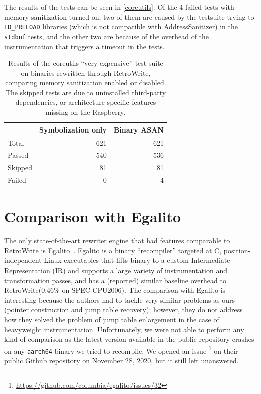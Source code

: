 \documentclass[a4paper,11pt,oneside]{report}
\newcommand{\sysname}{RetroWrite\xspace}
\begin{document}
The results of the tests can be seen in \autoref{coreutils}. Of the 4 failed
tests with memory sanitization turned on, two of them are caused by the
testsuite trying to \texttt{LD\_PRELOAD} libraries (which is not compatible
with AddressSanitizer) in the \texttt{stdbuf} tests, and the other two are
because of the overhead of the instrumentation that triggers a timeout in the
tests.




\begin{table}
\centering
\begin{tabular}{lrr}
\toprule
	& \textbf{Symbolization only} & \textbf{Binary ASAN} \\
\toprule
	Total              & 621 & 621 \\
	Passed              & 540  & 536  \\
	Skipped              & 81  & 81  \\
	Failed              & 0  & 4  \\
\bottomrule
\end{tabular}
\caption{Results of the coreutils ``very expensive'' test suite on binaries rewritten through \sysname, comparing memory sanitization enabled or disabled. The skipped tests are due to uninstalled third-party dependencies, or architecture specific features missing on the Raspberry.}
\label{coreutils}
\end{table}



\section{Comparison with Egalito}
The only state-of-the-art rewriter engine that had features comparable to
\sysname is Egalito~\cite{egalito}. Egalito is a binary ``recompiler'' targeted
at C, position-independent Linux executables that lifts binary to a custom
Intermediate Representation (IR) and supports a large variety of
instrumentation and transformation passes, and has a (reported) similar
baseline overhead to \sysname (0.46\% on SPEC CPU2006). The comparison with
Egalito is interesting because the authors had to tackle very similar problems
as ours (pointer construction and jump table recovery); however, they do not
address how they solved the problem of jump table enlargement in the case of
heavyweight instrumentation.  Unfortunately, we were not able to perform any
kind of comparison as the latest version available in the public repository
crashes on any \texttt{aarch64} binary we tried to recompile. We opened an
issue \footnote{\url{https://github.com/columbia/egalito/issues/32}} on their
public Github repository on November 28, 2020, but it still left unanswered.
\end{document}

